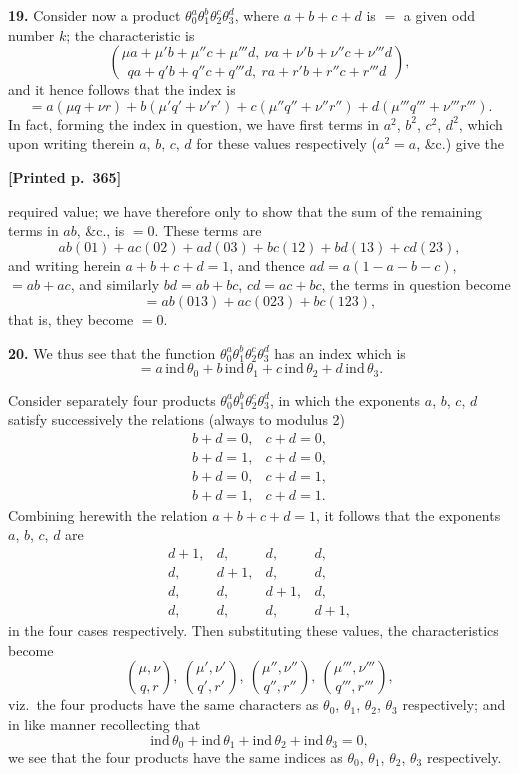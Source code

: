 \documentclass[11pt]{article}
\begin{document}
\medskip
\noindent\textbf{19.} Consider now a product $\theta_{0}^{a}\theta_{1}^{b}\theta_{2}^{c}\theta_{3}^{d}$, where $a+b+c+d$ is $=$ a given odd number $k$; the characteristic is
\[
\binom{\mu a+\mu' b+\mu'' c+\mu''' d,\ \nu a+\nu' b+\nu'' c+\nu''' d}{qa+q' b+q'' c+q''' d,\ ra+r' b+r'' c+r''' d},
\]
and it hence follows that the index is
\[
=a(\mu q+\nu r)+b(\mu' q'+\nu' r')+c(\mu'' q''+\nu'' r'')+d(\mu''' q'''+\nu''' r''').
\]
In fact, forming the index in question, we have first terms in $a^{2}$, $b^{2}$, $c^{2}$, $d^{2}$, which upon writing therein $a$, $b$, $c$, $d$ for these values respectively ($a^{2}=a$, \&c.) give the

\medskip
\noindent\textbf{[Printed p.~365]}\hfill

required value; we have therefore only to show that the sum of the remaining terms in $ab$, \&c., is $=0$. These terms are
\[
ab(01)+ac(02)+ad(03)+bc(12)+bd(13)+cd(23),
\]
and writing herein $a+b+c+d=1$, and thence $ad=a(1-a-b-c)$, $=ab+ac$, and similarly $bd=ab+bc$, $cd=ac+bc$, the terms in question become
\[
=ab(013)+ac(023)+bc(123),
\]
that is, they become $=0$.

\medskip
\noindent\textbf{20.} We thus see that the function $\theta_{0}^{a}\theta_{1}^{b}\theta_{2}^{c}\theta_{3}^{d}$ has an index which is
\[
=a\,\mathrm{ind}\,\theta_{0}+b\,\mathrm{ind}\,\theta_{1}+c\,\mathrm{ind}\,\theta_{2}+d\,\mathrm{ind}\,\theta_{3}.
\]

Consider separately four products $\theta_{0}^{a}\theta_{1}^{b}\theta_{2}^{c}\theta_{3}^{d}$, in which the exponents $a$, $b$, $c$, $d$ satisfy successively the relations (always to modulus 2)
\[
\begin{array}{ll}
b+d=0, & c+d=0,\\
b+d=1, & c+d=0,\\
b+d=0, & c+d=1,\\
b+d=1, & c+d=1.
\end{array}
\]
Combining herewith the relation $a+b+c+d=1$, it follows that the exponents $a$, $b$, $c$, $d$ are
\[
\begin{array}{llll}
d+1, & d, & d, & d,\\
d, & d+1, & d, & d,\\
d, & d, & d+1, & d,\\
d, & d, & d, & d+1,
\end{array}
\]
in the four cases respectively. Then substituting these values, the characteristics become
\[
\binom{\mu,\nu}{q,r},\ \binom{\mu',\nu'}{q',r'},\ \binom{\mu'',\nu''}{q'',r''},\ \binom{\mu''',\nu'''}{q''',r'''},
\]
viz.\ the four products have the same characters as $\theta_{0}$, $\theta_{1}$, $\theta_{2}$, $\theta_{3}$ respectively; and in like manner recollecting that
\[
\mathrm{ind}\,\theta_{0}+\mathrm{ind}\,\theta_{1}+\mathrm{ind}\,\theta_{2}+\mathrm{ind}\,\theta_{3}=0,
\]
we see that the four products have the same indices as $\theta_{0}$, $\theta_{1}$, $\theta_{2}$, $\theta_{3}$ respectively.
\end{document}
